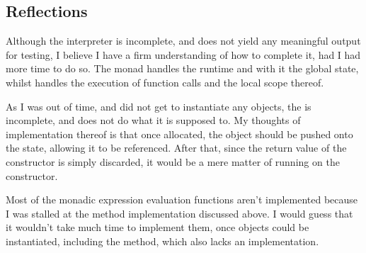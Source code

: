 %
%

\subsection{Reflections}
Although the interpreter is incomplete, and does not yield any meaningful
output for testing, I believe I have a firm understanding of how to complete
it, had I had more time to do so. The  monad handles the runtime
and with it the global state, whilst  handles the execution
of function calls and the local scope thereof.

As I was out of time, and did not get to instantiate any objects, the
 is incomplete, and does not do what it is supposed to. My
thoughts of implementation thereof is that once allocated, the object should
be pushed onto the state, allowing it to be referenced. After that, since the
return value of the constructor is simply discarded, it would be a mere matter
of running  on the constructor.

Most of the monadic expression evaluation functions aren't implemented because
I was stalled at the method implementation discussed above. I would guess that
it wouldn't take much time to implement them, once objects could be
instantiated, including the  method, which also lacks an
implementation.
